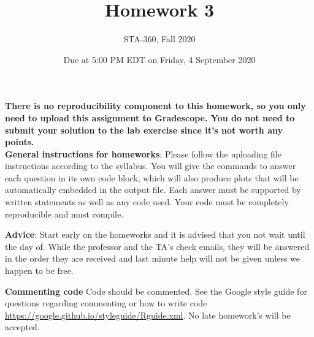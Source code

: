 \documentclass{article}
\begin{document}
\title{Homework 3}
\author{STA-360, Fall 2020}
\date{Due at 5:00 PM EDT  on Friday, 4 September 2020}
\maketitle

\textbf{There is no reproducibility component to this homework, so you only need to upload this assignment to Gradescope. You do not need to submit your solution to the lab exercise since it's not worth any points.}\\

\textbf{General instructions for homeworks}: Please follow the uploading file instructions according to the syllabus. You will give the commands to answer each question in its own code block, which will also produce plots that will be automatically embedded in the output file. Each answer must be supported by written statements as well as any code used. Your code must be completely reproducible and must compile. 

\textbf{Advice}: Start early on the homeworks and it is advised that you not wait until the day of. While the professor and the TA's check emails, they will be answered in the order they are received and last minute help will not be given unless we happen to be free.  

\textbf{Commenting code}
Code should be commented. See the Google style guide for questions regarding commenting or how to write 
code \url{https://google.github.io/styleguide/Rguide.xml}. No late homework's will be accepted.


\end{document}
